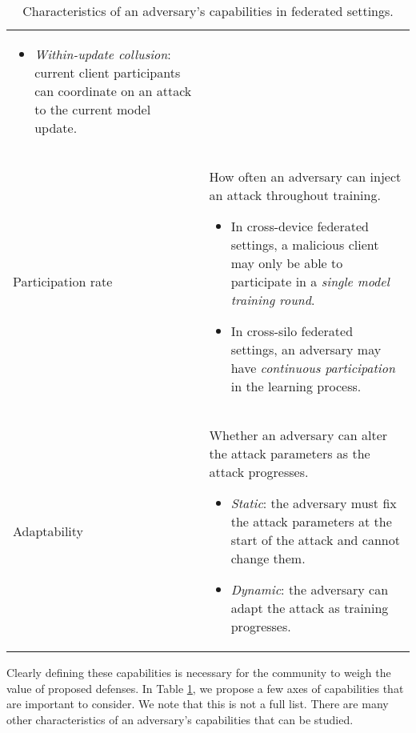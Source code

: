 \begin{table}[ht]
\begin{center}
\begin{tabularx}{\textwidth}{lX}
\begin{itemize}[leftmargin=*]
    \item \emph{Within-update collusion}: current client participants can coordinate on an attack to the current model update.
\end{itemize}
\\[-.5em]
\raggedright Participation rate & How often an adversary can inject an attack throughout training. 
\begin{itemize}[leftmargin=*]
    \setlength\itemsep{0.05em}
    \item In cross-device federated settings, a malicious client may only be able to participate in a \emph{single model training round}.
    \item In cross-silo federated settings, an adversary may have \emph{continuous participation} in the learning process.
\end{itemize}
\\[-.5em]
Adaptability & Whether an adversary can alter the attack parameters as the attack progresses.
\begin{itemize}[leftmargin=*]
    \setlength\itemsep{0.05em}
    \item \emph{Static}: the adversary must fix the attack parameters at the start of the attack and cannot change them.
    \item \emph{Dynamic}: the adversary can adapt the attack as training progresses.
\end{itemize}
\\
\bottomrule
\end{tabularx} 
\end{center}
\caption{Characteristics of an adversary's capabilities in federated settings. } 
\label{table:capabilities}
\end{table}
\restoregeometry

Clearly defining these capabilities is necessary for the community to weigh the value of proposed defenses. In Table \ref{table:capabilities}, we propose a few axes of capabilities that are important to consider. We note that this is not a full list. There are many other characteristics of an adversary's capabilities that can be studied.


